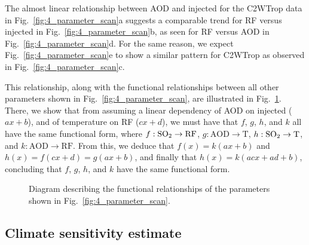 \documentclass[draft]{agujournal2019}
\newcommand{\iso}[1][i]{{#1}njected \ce{SO2}}
\newcommand{\cwt}{C2WTrop}
\begin{document}
The almost linear relationship between AOD and \iso{} for the \cwt{} data in
Fig.~\ref{fig:4_parameter_scan}a suggests a comparable trend for RF versus \iso{} in
Fig.~\ref{fig:4_parameter_scan}b, as seen for RF versus AOD in
Fig.~\ref{fig:4_parameter_scan}d. For the same reason, we expect
Fig.~\ref{fig:4_parameter_scan}e to show a similar pattern for \cwt{} as observed in
Fig.~\ref{fig:4_parameter_scan}c.

This relationship, along with the functional relationships between all other parameters
shown in Fig.~\ref{fig:4_parameter_scan}, are illustrated in
Fig.~\ref{fig:5_diagram_of_function_relations}. There, we show that from assuming a
linear dependency of AOD on \iso{} (\(ax+b\)), and of temperature on RF (\(cx+d\)), we
must have that \(f\), \(g\), \(h\), and \(k\) all have the same functional form, where
\(f: \ce{SO2} \to \mathrm{RF}\), \(g: \mathrm{AOD} \to \mathrm{T}\), \(h: \ce{SO2} \to
\mathrm{T}\), and \(k: \mathrm{AOD} \to \mathrm{RF}\). From this, we deduce that
\(f(x)=k(ax+b)\) and \(h(x)=f(cx+d)=g(ax+b)\), and finally that \(h(x)=k(acx+ad+b)\),
concluding that \(f\), \(g\), \(h\), and \(k\) have the same functional form.

\begin{figure}
  \centering


  \caption{Diagram describing the functional relationships of the parameters shown in
    Fig.~\ref{fig:4_parameter_scan}.}\label{fig:5_diagram_of_function_relations}%
\end{figure}

\subsection{Climate sensitivity estimate}
\end{document}
